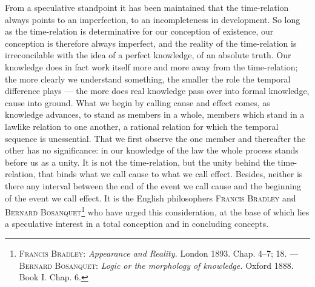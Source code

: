 \documentclass[12pt,a4paper]{book}
\begin{document}
From a speculative standpoint it has been maintained that the time-relation
always points to an imperfection, to an incompleteness in development. So long as
the time-relation is determinative for our conception of existence, our
conception is therefore always imperfect, and the reality of the time-relation is
irreconcilable with the idea of a perfect knowledge, of an absolute truth. Our
knowledge does in fact work itself more and more away from the time-relation; the
more clearly we understand something, the smaller the role the temporal
difference plays --- the more does real knowledge pass over into formal
knowledge, cause into ground. What we begin by calling cause and effect comes, as
knowledge advances, to stand as members in a whole, members which stand in a
lawlike relation to one another, a rational relation for which the temporal
sequence is unessential. That we first observe the one member and thereafter the
other has no significance: in our knowledge of the law the whole process stands
before us as a unity. It is not the time-relation, but the unity behind the
time-relation, that binds what we call cause to what we call effect. Besides,
neither is there any interval between the end of the event we call cause and the
beginning of the event we call effect. It is the English philosophers
\textsc{Francis Bradley} and \textsc{Bernard
Bosanquet}\footnote{\textsc{Francis Bradley}: \textit{Appearance and Reality.}
London 1893. Chap. 4--7; 18. --- \textsc{Bernard Bosanquet}: \textit{Logic or
the morphology of knowledge.} Oxford 1888. Book I. Chap. 6.} who have urged this
consideration, at the base of which lies a speculative interest in a total
conception and in concluding concepts.
\end{document}
